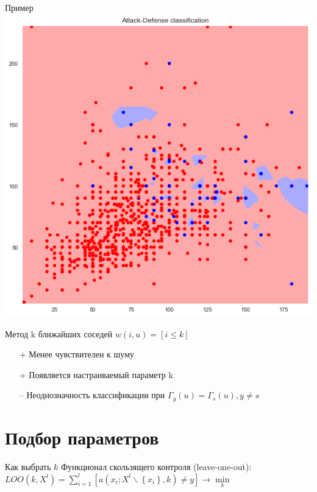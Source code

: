 \documentclass[10pt]{beamer}
\begin{document}
\begin{frame}{Пример}
    \centering
	\includegraphics[width=\linewidth,height=\textheight,keepaspectratio]{images/attack_vs_defense_fail}
\end{frame}

\begin{frame}{Метод k ближайших соседей}
	${w(i, u) = [i \leq k]}$\\
	\bigbreak
	\begin{itemize} [<+- | alert@+>]
		\item[+] Менее чувствителен к шуму
		\item[+] Появляется настраиваемый параметр k
	  \bigbreak
	  \item[--] Неоднозначность классификации при ${\Gamma_y(u) = \Gamma_s(u), y \neq s}$
	\end{itemize}
\end{frame}

\section{Подбор параметров}

\begin{frame}{Как выбрать $k$}
	Функционал скользящего контроля (leave-one-out):\\
	${LOO(k, X^l) = \sum\limits_{i=1}^l [a(x_i; X^l \backslash \left\{x_i\right\}, k) \neq y] \rightarrow \min\limits_k}$\\
\end{frame}
\end{document}
